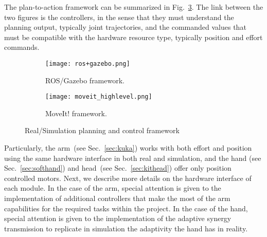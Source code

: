 The plan-to-action framework can be summarized in Fig.~\ref{fig:framework}. The link between the two figures is the controllers, in the sense that they must understand the planning output, typically joint trajectories, and the commanded values that must be compatible with the hardware resource type, typically position and effort commands.

\begin{figure}
\centering
\begin{subfigure}[t]{0.58\textwidth}
\centerline{\texttt{[image: ros+gazebo.png]}}
\caption{ROS/Gazebo framework.}
\label{fig:rosgazebointeraction}
\end{subfigure}
\begin{subfigure}[t]{0.4\textwidth}
\centerline{\texttt{[image: moveit\_highlevel.png]}}
\caption{MoveIt! framework.}
\label{fig:planning}
\end{subfigure}
\caption{Real/Simulation planning and control framework}
\label{fig:framework}
\end{figure}

Particularly, the arm~(see Sec.~\ref{sec:kuka}) works with both effort and position using the same hardware interface in both real and simulation, and the hand (see Sec.~\ref{sec:softhand}) and head~(see Sec.~\ref{sec:kithead}) offer only position controlled motors. Next, we describe more details on the hardware interface of each module. In the case of the arm, special attention is given to the implementation of additional controllers that make the most of the arm capabilities for the required tasks within the project. In the case of the hand, special attention is given to the implementation of the adaptive synergy transmission to replicate in simulation the adaptivity the hand has in reality.
